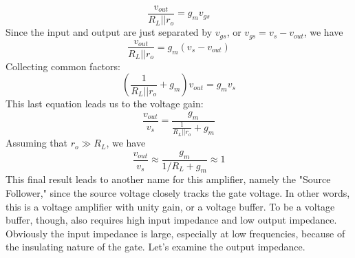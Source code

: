     \begin{equation}
        \frac{{{v_{out}}}}{{{R_L}||{r_o}}} = {g_m}{v_{gs}}
    \end{equation}
Since the input and output are just separated by $v_{gs}$, or $v_{gs} = v_{s} - v_{out}$, we have
    \begin{equation}
        \frac{{{v_{out}}}}{{{R_L}||{r_o}}} = {g_m}\left( {{v_{s}} - {v_{out}}} \right)
    \end{equation}
Collecting common factors:
    \begin{equation}
        \left( {\frac{1}{{{R_L}||{r_o}}} + {g_m}} \right){v_{out}} = {g_m}{v_{s}}
    \end{equation}
This last equation leads us to the voltage gain:
    \begin{equation}
        \frac{{{v_{out}}}}{{{v_{s}}}} = \frac{{{g_m}}}{{\frac{1}{{{R_L}||{r_o}}} + {g_m}}}
    \end{equation}
Assuming that $r_o \gg R_L$, we have
    \begin{equation}
        \frac{{{v_{out}}}}{{{v_{s}}}} \approx \frac{{{g_m}}}{{1/{R_L} + {g_m}}} \approx 1
    \end{equation}
This final result leads to another name for this amplifier, namely the "Source Follower," since the source voltage closely tracks the gate voltage.  In other words, this is a voltage amplifier with unity gain, or a voltage buffer.
To be a voltage buffer, though, also requires high input impedance and low output impedance.  Obviously the input impedance is large, especially at low frequencies, because of the insulating nature of the gate.  Let's examine the output impedance.
